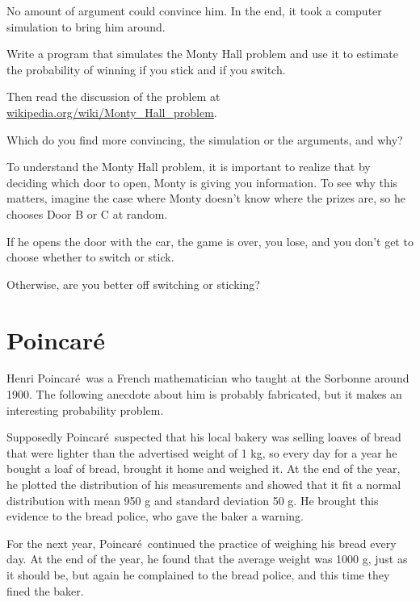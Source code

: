 \documentclass[12pt]{book}
\begin{document}
No amount of argument could convince him.  In the end, it took
a computer simulation to bring him around.

\begin{ex}

Write a program that simulates the Monty Hall problem and use
it to estimate the probability of winning if you stick and if
you switch.

Then read the discussion of the problem at
\url{wikipedia.org/wiki/Monty_Hall_problem}.

Which do you find more convincing, the simulation or the arguments,
and why?

\end{ex}


\begin{ex}

To understand the Monty Hall problem, it is important to realize
that by deciding which door to open, Monty is giving you information.
To see why this matters, imagine the case where Monty doesn't
know where the prizes are, so he chooses Door B or C at random.

If he opens the door with the car, the game is over, you lose, and
you don't get to choose whether to switch or stick.

Otherwise, are you better off switching or sticking?

\end{ex}



\newcommand{\Poincare}{Poincar\'{e}}

\section{\Poincare}

Henri \Poincare~was a French mathematician who taught at the Sorbonne
around 1900.  The following anecdote about him is probably fabricated,
but it makes an interesting probability problem.

Supposedly \Poincare~suspected that his local bakery was selling
loaves of bread that were lighter than the advertised weight of 1 kg,
so every day for a year he bought a loaf of bread, brought it home and
weighed it.  At the end of the year, he plotted the distribution of
his measurements and showed that it fit a normal distribution with
mean 950 g and standard deviation 50 g.  He brought this evidence to
the bread police, who gave the baker a warning.

For the next year, \Poincare~continued the practice of weighing his
bread every day.  At the end of the year, he found that the average
weight was 1000 g, just as it should be, but again he complained to
the bread police, and this time they fined the baker.
\end{document}
